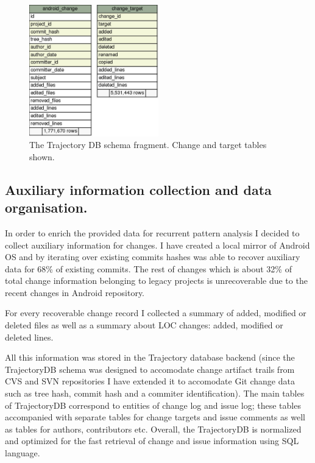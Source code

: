 \documentclass[a4paper,10pt]{article}
\numberwithin{equation}{subsection}
\begin{document}
\begin{figure}
   \begin{center}
   \includegraphics[scale=0.4,width=0.5\textwidth]{figures/schema-change-fragment.png}
   \end{center}
   \caption{The Trajectory DB schema fragment. Change and target tables shown.}
   \label{fig:schema_change_fragment}
\end{figure}

\subsection{Auxiliary information collection and data organisation.}
In order to enrich the provided data for recurrent pattern analysis I decided to collect auxiliary 
information for changes. I have created a local mirror of Android OS and by iterating over existing 
commits hashes was able to recover auxiliary data for 68\% of existing commits. The rest 
of changes which is about 32\% of total change information belonging to legacy projects is 
unrecoverable due to the recent changes in Android repository. 

For every recoverable change record I collected a summary of added, modified or deleted files 
as well as a summary about LOC changes: added, modified or deleted lines.

All this information was stored in the Trajectory database backend (since the TrajectoryDB schema
was designed to accomodate change artifact trails from CVS and SVN repositories I have extended
it to accomodate Git change data such as tree hash, commit hash and a commiter identification).
The main tables of TrajectoryDB correspond to entities of change log and issue log; these tables 
accompanied with separate tables for change targets and issue comments as well as tables for
authors, contributors etc. Overall, the TrajectoryDB is normalized and optimized for the fast 
retrieval of change and issue information using SQL language.
\end{document}
